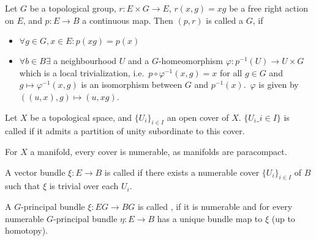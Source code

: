 \documentclass[a4paper,12pt]{article}
\begin{document}

\begin{definition}
    Let \(G\) be a topological group, \(r:E\times G\to E\), \(r(x,g)=xg\) be a free right action on \(E\), and \(p:E\to B\) a continuous map. Then \((p,r)\) is called a \(G\), if 
    \begin{itemize}
        \item \(\forall g\in G, x\in E: p(xg)=p(x)\)
        \item \(\forall b\in B\exists\) a neighbourhood \(U\) and a \(G\)-homeomorphism \(\varphi:p^{-1}(U)\to U\times G\) which is a local trivialization, i.e.\ \(p\circ\varphi^{-1}(x,g)=x\) for all \(g\in G\) and \(g\mapsto\varphi^{-1}(x,g)\) is an isomorphism between \(G\) and \(p^{-1}(x)\).\ \(\varphi\) is given by \(((u,x),g)\mapsto (u,xg)\).
    \end{itemize}
\end{definition}

\begin{definition}
    Let \(X\) be a topological space, and \(\{U_i \}_{i\in I}\) an open cover of \(X\). \(\{U_i\_{i\in I}\}\) is called  if it admits a partition of unity subordinate to this cover.
\end{definition}

\begin{remark}
    For \(X\) a manifold, every cover is numerable, as manifolds are paracompact.
\end{remark}

\begin{definition}
    A vector bundle \(\xi:E\to B\) is called  if there exists a numerable cover \(\{U_i \}_{i\in I}\) of \(B\) such that \(\xi\) is trivial over each \(U_i\).
\end{definition}

\begin{definition}
    A \(G\)-principal bundle \(\xi:EG\to BG\) is called , if it is numerable and for every numerable \(G\)-principal bundle \(\eta:E\to B\) has a unique bundle map to \(\xi\) (up to homotopy).
\end{definition}
\end{document}
